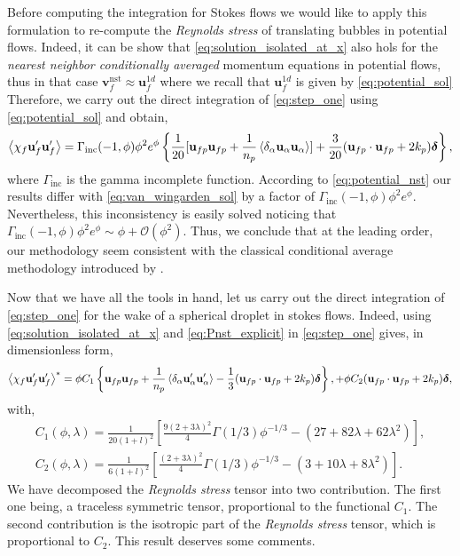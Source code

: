 Before computing the integration for Stokes flows we would like to apply this formulation to re-compute the \textit{Reynolds stress} of translating bubbles in potential flows. 
Indeed, it can be show that \ref{eq:solution_isolated_at_x} also hols for the \textit{nearest neighbor conditionally averaged} momentum equations in potential flows, thus in that case $\textbf{v}^\text{nst}_f \approx \textbf{u}_f^{1d}$ where we recall that $ \textbf{u}_f^{1d}$ is given by \ref{eq:potential_sol}
Therefore, we carry out the direct integration of \ref{eq:step_one} using \ref{eq:potential_sol} and obtain, 
\begin{equation}
    \avg{\chi_f \textbf{u}_f'\textbf{u}_f'}
    = \Gamma_\text{inc}(-1,\phi)\phi^2 e^\phi \left\{
        \frac{1}{20}[\textbf{u}_{fp}\textbf{u}_{fp}+ \frac{1}{n_p}\pavg{\textbf{u}_\alpha\textbf{u}_\alpha}]
        + 
        \frac{3}{20} (\textbf{u}_{fp}\cdot \textbf{u}_{fp} + 2k_p)\bm\delta
    \right\},
    \label{eq:potential_nst}
\end{equation}
where $\Gamma_\text{inc}$ is the gamma incomplete function. 
According to \ref{eq:potential_nst} our results differ with \ref{eq:van_wingarden_sol} by a factor of $\Gamma_\text{inc}(-1,\phi)\phi^2 e^\phi$. 
Nevertheless, this inconsistency is easily solved noticing that $\Gamma_\text{inc}(-1,\phi)\phi^2 e^\phi \sim \phi + \mathcal{O}(\phi^2)$. 
Thus, we conclude that at the leading order, our methodology seem consistent with the classical conditional average methodology introduced by \citet{batchelor1972sedimentation}. 

Now that we have all the tools in hand, let us carry out the direct integration of \ref{eq:step_one} for the wake of a spherical droplet in stokes flows. 
Indeed, using \ref{eq:solution_isolated_at_x} and \ref{eq:Pnst_explicit} in \ref{eq:step_one} gives, in dimensionless form,  
\begin{equation}
    \avg{\chi_f  \textbf{u}_f'\textbf{u}_f'}^*
    = \phi    
    C_1
    \left\{
        \textbf{u}_{fp}\textbf{u}_{fp}+ \frac{1}{n_p}\pavg{\textbf{u}_\alpha'\textbf{u}_\alpha'}
        -\frac{1}{3} (\textbf{u}_{fp}\cdot \textbf{u}_{fp} + 2k_p)\bm\delta
    \right\},    
    + \phi C_2
    (\textbf{u}_{fp}\cdot \textbf{u}_{fp} + 2k_p)\bm\delta,
    \label{eq:final_closure}
\end{equation}
with,
\begin{align*}
    C_1(\phi,\lambda)
    = \frac{1}{20(1+l)^2}\left[
        \frac{9(2+3\lambda)^2}{4}\Gamma(1/3) \phi^{-1/3}
        - (27+82\lambda +62\lambda^2)
    \right],\\
    C_2(\phi,\lambda)
    = \frac{1}{6(1+l)^2}\left[
        \frac{(2+3\lambda)^2}{4}\Gamma(1/3) \phi^{-1/3}
        - (3+10\lambda +8\lambda^2)
    \right].
\end{align*}
We have decomposed the \textit{Reynolds stress} tensor into two contribution. 
The first one being, a traceless symmetric tensor, proportional to the functional $C_1$. 
The second contribution is the isotropic part of the \textit{Reynolds stress} tensor, which is proportional to $C_2$. 
This result deserves some comments. 

